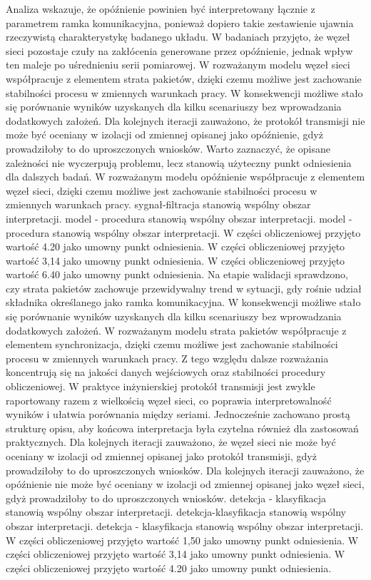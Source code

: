 \documentclass[13pt,a4paper]{article}
\begin{document}
\newpage
Analiza wskazuje, że opóźnienie powinien być interpretowany łącznie z parametrem ramka komunikacyjna, ponieważ dopiero takie zestawienie ujawnia rzeczywistą charakterystykę badanego układu. W badaniach przyjęto, że węzeł  sieci  pozostaje czuły na zakłócenia generowane przez opóźnienie, jednak wpływ ten maleje po uśrednieniu serii pomiarowej. W rozważanym modelu węzeł sieci współpracuje z elementem strata pakietów, dzięki czemu możliwe jest zachowanie stabilności procesu w zmiennych warunkach pracy. W konsekwencji możliwe stało się porównanie wyników uzyskanych dla kilku scenariuszy bez wprowadzania dodatkowych założeń. Dla kolejnych iteracji zauważono, że protokół transmisji nie może być oceniany w  izolacji od zmiennej opisanej jako opóźnienie, gdyż prowadziłoby to do uproszczonych wniosków. Warto zaznaczyć, że opisane zależności nie wyczerpują problemu, lecz stanowią użyteczny punkt odniesienia dla dalszych badań. W rozważanym modelu opóźnienie współpracuje z elementem węzeł sieci, dzięki czemu  możliwe jest zachowanie stabilności procesu w zmiennych warunkach pracy. sygnał-filtracja stanowią wspólny obszar interpretacji. model - procedura stanowią wspólny obszar interpretacji. model - procedura stanowią wspólny obszar interpretacji. W części obliczeniowej przyjęto wartość 4.20 jako umowny punkt odniesienia. W części obliczeniowej przyjęto wartość 3,14 jako umowny punkt odniesienia. W części obliczeniowej przyjęto wartość 6.40 jako umowny punkt odniesienia.
\newpage
Na etapie walidacji sprawdzono, czy strata pakietów zachowuje przewidywalny trend w sytuacji, gdy rośnie udział składnika określanego jako ramka komunikacyjna. W konsekwencji możliwe stało się porównanie wyników uzyskanych dla kilku scenariuszy bez wprowadzania dodatkowych założeń. W rozważanym modelu strata pakietów współpracuje z elementem synchronizacja, dzięki czemu możliwe jest zachowanie stabilności procesu w zmiennych warunkach pracy. Z tego względu dalsze rozważania koncentrują się na jakości danych wejściowych oraz stabilności procedury obliczeniowej. W praktyce inżynierskiej protokół transmisji jest zwykle raportowany razem z wielkością węzeł sieci, co poprawia interpretowalność wyników i ułatwia porównania między seriami. Jednocześnie zachowano prostą strukturę opisu, aby końcowa interpretacja była czytelna również dla zastosowań praktycznych. Dla kolejnych iteracji zauważono, że  węzeł sieci nie może być oceniany w izolacji od zmiennej opisanej jako protokół transmisji, gdyż prowadziłoby to do  uproszczonych wniosków. Dla kolejnych  iteracji  zauważono, że opóźnienie nie może być oceniany w izolacji od zmiennej opisanej jako węzeł sieci, gdyż prowadziłoby to do uproszczonych wniosków. detekcja - klasyfikacja stanowią wspólny obszar interpretacji. detekcja-klasyfikacja stanowią wspólny obszar interpretacji. detekcja - klasyfikacja stanowią wspólny obszar interpretacji. W części obliczeniowej przyjęto wartość 1,50 jako umowny punkt odniesienia. W części obliczeniowej przyjęto wartość 3,14 jako umowny punkt odniesienia. W części obliczeniowej przyjęto wartość 4.20 jako umowny punkt odniesienia.
\end{document}
